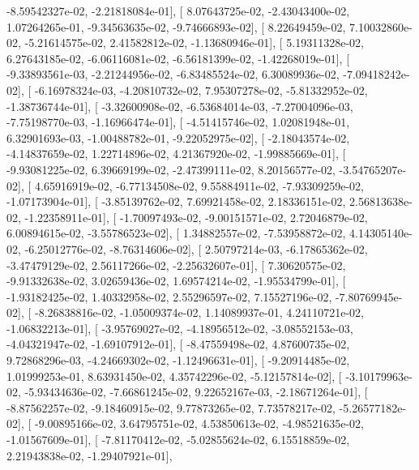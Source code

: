 \documentclass{article}
\begin{document}
         -8.59542327e-02,  -2.21818084e-01],
       [  8.07643725e-02,  -2.43043400e-02,   1.07264265e-01,
         -9.34563635e-02,  -9.74666893e-02],
       [  8.22649459e-02,   7.10032860e-02,  -5.21614575e-02,
          2.41582812e-02,  -1.13680946e-01],
       [  5.19311328e-02,   6.27643185e-02,  -6.06116081e-02,
         -6.56181399e-02,  -1.42268019e-01],
       [ -9.33893561e-03,  -2.21244956e-02,  -6.83485524e-02,
          6.30089936e-02,  -7.09418242e-02],
       [ -6.16978324e-03,  -4.20810732e-02,   7.95307278e-02,
         -5.81332952e-02,  -1.38736744e-01],
       [ -3.32600908e-02,  -6.53684014e-03,  -7.27004096e-03,
         -7.75198770e-03,  -1.16966474e-01],
       [ -4.51415746e-02,   1.02081948e-01,   6.32901693e-03,
         -1.00488782e-01,  -9.22052975e-02],
       [ -2.18043574e-02,  -4.14837659e-02,   1.22714896e-02,
          4.21367920e-02,  -1.99885669e-01],
       [ -9.93081225e-02,   6.39669199e-02,  -2.47399111e-02,
          8.20156577e-02,  -3.54765207e-02],
       [  4.65916919e-02,  -6.77134508e-02,   9.55884911e-02,
         -7.93309259e-02,  -1.07173904e-01],
       [ -3.85139762e-02,   7.69921458e-02,   2.18336151e-02,
          2.56813638e-02,  -1.22358911e-01],
       [ -1.70097493e-02,  -9.00151571e-02,   2.72046879e-02,
          6.00894615e-02,  -3.55786523e-02],
       [  1.34882557e-02,  -7.53958872e-02,   4.14305140e-02,
         -6.25012776e-02,  -8.76314606e-02],
       [  2.50797214e-03,  -6.17865362e-02,  -3.47479129e-02,
          2.56117266e-02,  -2.25632607e-01],
       [  7.30620575e-02,  -9.91332638e-02,   3.02659436e-02,
          1.69574214e-02,  -1.95534799e-01],
       [ -1.93182425e-02,   1.40332958e-02,   2.55296597e-02,
          7.15527196e-02,  -7.80769945e-02],
       [ -8.26838816e-02,  -1.05009374e-02,   1.14089937e-01,
          4.24110721e-02,  -1.06832213e-01],
       [ -3.95769027e-02,  -4.18956512e-02,  -3.08552153e-03,
         -4.04321947e-02,  -1.69107912e-01],
       [ -8.47559498e-02,   4.87600735e-02,   9.72868296e-03,
         -4.24669302e-02,  -1.12496631e-01],
       [ -9.20914485e-02,   1.01999253e-01,   8.63931450e-02,
          4.35742296e-02,  -5.12157814e-02],
       [ -3.10179963e-02,  -5.93434636e-02,  -7.66861245e-02,
          9.22652167e-03,  -2.18671264e-01],
       [ -8.87562257e-02,  -9.18460915e-02,   9.77873265e-02,
          7.73578217e-02,  -5.26577182e-02],
       [ -9.00895166e-02,   3.64795751e-02,   4.53850613e-02,
         -4.98521635e-02,  -1.01567609e-01],
       [ -7.81170412e-02,  -5.02855624e-02,   6.15518859e-02,
          2.21943838e-02,  -1.29407921e-01],
\end{document}
